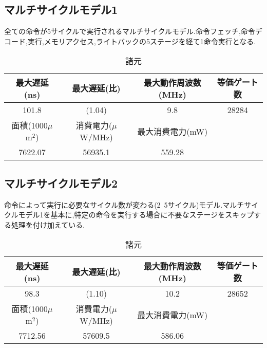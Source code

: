 \documentclass[11pt,a4j]{jarticle}
\begin{document}
\subsection{マルチサイクルモデル1}
全ての命令が5サイクルで実行されるマルチサイクルモデル.命令フェッチ,命令デコード,実行,メモリアクセス,ライトバックの5ステージを経て1命令実行となる.
\begin{table}[htb]
\caption{諸元}
\begin{tabular}{|c|c|c|c|} \hline
最大遅延(ns) & 最大遅延(比) & 最大動作周波数(MHz) & 等価ゲート数 \\ \hline
101.8 & (1.04) & 9.8 & 28284 \\ \hline \hline
面積(1000$\mu$m$^2$) & 消費電力($\mu$W/MHz) & 最大消費電力(mW) & \\ \hline
7622.07 & 56935.1 & 559.28 & \\ \hline
\end{tabular}
\end{table}


\subsection{マルチサイクルモデル2}
命令によって実行に必要なサイクル数が変わる(2~5サイクル)モデル.マルチサイクルモデル1を基本に,特定の命令を実行する場合に不要なステージをスキップする処理を付け加えている.
\begin{table}[htb]
\caption{諸元}
\begin{tabular}{|c|c|c|c|} \hline
最大遅延(ns) & 最大遅延(比) & 最大動作周波数(MHz) & 等価ゲート数 \\ \hline
98.3 & (1.10) & 10.2 & 28652 \\ \hline \hline
面積(1000$\mu$m$^2$) & 消費電力($\mu$W/MHz) & 最大消費電力(mW) & \\ \hline
7712.56 & 57609.5 & 586.06 & \\ \hline
\end{tabular}
\end{table}
\end{document}
